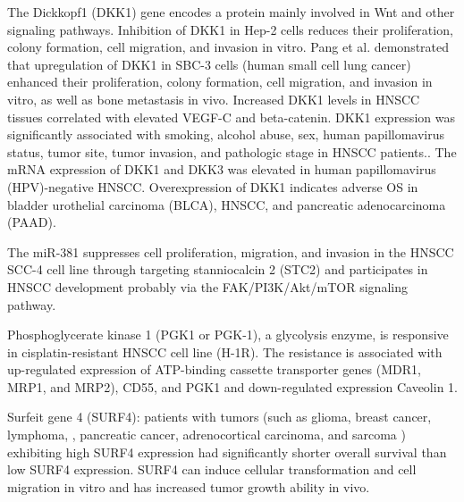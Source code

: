 \documentclass[jpm,article,submit,moreauthors,pdftex]{Definitions/mdpi}
\begin{document}
\begin{paracol}{2}
The Dickkopf1 (DKK1) gene encodes a protein mainly involved in Wnt and other signaling pathways.
Inhibition of DKK1 in Hep-2 cells reduces their proliferation, colony formation, cell migration, and invasion in vitro\cite{Shi2014}.
Pang et al.\cite{Pang2018} demonstrated that upregulation of DKK1 in SBC-3 cells (human small cell lung cancer) enhanced their proliferation, colony formation, cell migration, and invasion in vitro, as well as bone metastasis in vivo. 
Increased DKK1 levels in HNSCC tissues correlated with elevated VEGF-C and beta-catenin\cite{Shi2014}.
DKK1 expression was significantly associated with smoking, alcohol abuse, sex, human papillomavirus status\cite{Chakraborty2020}, tumor site, tumor invasion, and pathologic stage in HNSCC patients.\cite{Gao2018}.
The mRNA expression of DKK1 and DKK3 was elevated in human papillomavirus (HPV)-negative HNSCC\cite{Hu2020}. Overexpression of DKK1 indicates adverse OS in bladder urothelial carcinoma (BLCA)\cite{Wei2020}, HNSCC\cite{Chakraborty2020}\cite{Hu2020}\cite{Wei2020}, and pancreatic adenocarcinoma (PAAD)\cite{Wei2020}. %


The miR-381 suppresses cell proliferation, migration, and invasion in the HNSCC SCC-4 cell line through targeting stanniocalcin 2 (STC2) and participates in HNSCC development probably via the FAK/PI3K/Akt/mTOR signaling pathway.\cite{Ma2020}

Phosphoglycerate kinase 1 (PGK1 or PGK-1), a glycolysis enzyme, is responsive in cisplatin-resistant HNSCC cell line (H-1R). The resistance is associated with up-regulated expression of ATP-binding cassette transporter genes (MDR1, MRP1, and MRP2), CD55, and PGK1 and down-regulated expression Caveolin 1\cite{Nakamura2005}.

Surfeit gene 4 (SURF4): patients with tumors (such as glioma, breast cancer, lymphoma, , pancreatic cancer, adrenocortical carcinoma, and sarcoma%
) exhibiting high SURF4 expression had significantly shorter overall survival than low SURF4 expression. SURF4 can induce cellular transformation and cell migration in vitro and has increased tumor growth ability in vivo\cite{Kim2018a}.


\end{paracol}
\end{document}
